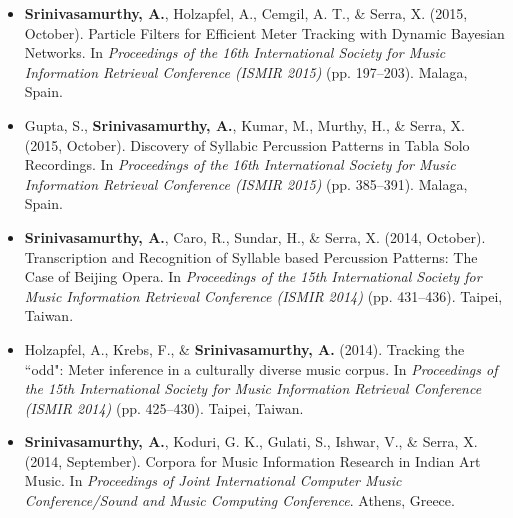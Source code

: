 \begin{itemize}[leftmargin=*]
	\item \textbf{Srinivasamurthy, A.}, Holzapfel, A., Cemgil, A. T., \& Serra, X. (2015, October). Particle Filters for Efficient Meter Tracking with Dynamic Bayesian Networks. In \emph{Proceedings of the 16th International Society for Music Information Retrieval Conference (ISMIR 2015)} (pp. 197--203). Malaga, Spain. 
	\item Gupta, S., \textbf{Srinivasamurthy, A.}, Kumar, M., Murthy, H., \& Serra, X. (2015, October). Discovery of Syllabic Percussion Patterns in Tabla Solo Recordings. In \emph{Proceedings of the 16th International Society for Music Information Retrieval Conference (ISMIR 2015)} (pp. 385--391). Malaga, Spain. 
	\item \textbf{Srinivasamurthy, A.}, Caro, R., Sundar, H., \& Serra, X. (2014, October). Transcription and Recognition of Syllable based Percussion Patterns: The Case of Beijing Opera. In \emph{Proceedings of the 15th International Society for Music Information Retrieval Conference (ISMIR 2014)} (pp. 431--436). Taipei, Taiwan.  %
	\item Holzapfel, A., Krebs, F., \& \textbf{Srinivasamurthy, A.} (2014). Tracking the ``odd": Meter inference in a culturally diverse music corpus. In \emph{Proceedings of the 15th International Society for Music Information Retrieval Conference (ISMIR 2014)} (pp. 425--430). Taipei, Taiwan.  %
	\item \textbf{Srinivasamurthy, A.}, Koduri, G. K., Gulati, S., Ishwar, V., \& Serra, X. (2014, September). Corpora for Music Information Research in Indian Art Music. In \emph{Proceedings of Joint International Computer Music Conference/Sound and Music Computing Conference}. Athens, Greece.  %

\end{itemize}
